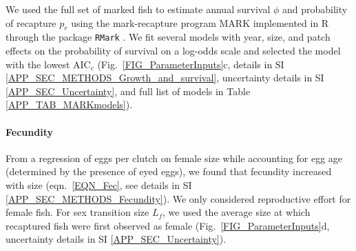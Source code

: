 \documentclass[12pt, oneside]{article}   	%
\begin{document}

We used the full set of marked fish to estimate annual survival $\phi$ and probability of recapture $p_r$ using the mark-recapture program MARK implemented in R through the package \texttt{RMark} \citep{RMark_Laake2013}. We fit several models with year, size, and patch effects on the probability of survival on a log-odds scale and selected the model with the lowest $\text{AIC}_c$ (Fig.\ \ref{FIG_ParameterInputs}c, details in SI \ref{APP_SEC_METHODS_Growth_and_survival}, uncertainty details in SI \ref{APP_SEC_Uncertainty}, and full list of models in Table \ref{APP_TAB_MARKmodels}). %

\paragraph*{Fecundity}

From a regression of eggs per clutch on female size while accounting for egg age (determined by the presence of eyed eggs), we found that fecundity increased with size (eqn.\ \ref{EQN_Fec}, see details in SI \ref{APP_SEC_METHODS_Fecundity}). We only considered reproductive effort for female fish. For sex transition size $L_f$, we used the average size at which recaptured fish were first observed as female (Fig.\ \ref{FIG_ParameterInputs}d, uncertainty details in SI \ref{APP_SEC_Uncertainty}).
\end{document}
